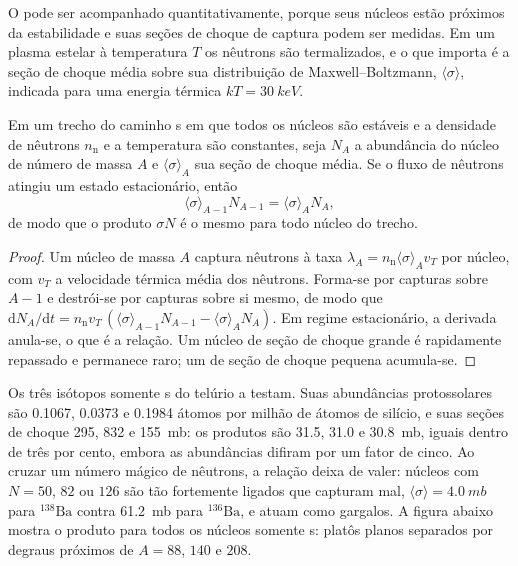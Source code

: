 O  pode ser acompanhado quantitativamente, porque seus núcleos estão
próximos da estabilidade e suas seções de choque de captura podem ser medidas. Em um
plasma estelar à temperatura $T$ os nêutrons são termalizados, e o que
importa é a seção de choque média sobre sua distribuição de Maxwell--Boltzmann,
$\langle\sigma\rangle$, indicada para uma energia térmica
$kT = \qty{30}{keV}$.

\begin{proposition}\label{prop:b3:origin-of-elements:sigma-n}
Em um trecho do caminho s em que todos os núcleos são estáveis e a densidade de nêutrons
$n_\mathrm{n}$ e a temperatura são constantes, seja $N_A$ a
abundância do núcleo de número de massa $A$ e $\langle\sigma\rangle_A$
sua seção de choque média. Se o fluxo de nêutrons atingiu um
estado estacionário, então
\[
\langle\sigma\rangle_{A-1} N_{A-1} = \langle\sigma\rangle_A N_A ,
\]
de modo que o produto $\sigma N$ é o mesmo para todo núcleo do
trecho.
\end{proposition}

\begin{proof}
Um núcleo de massa $A$ captura nêutrons à taxa
$\lambda_A = n_\mathrm{n}\langle\sigma\rangle_A v_T$ por núcleo, com
$v_T$ a velocidade térmica média dos nêutrons. Forma-se por capturas sobre
$A - 1$ e destrói-se por capturas sobre si mesmo, de modo que
$\mathrm{d}N_A/\mathrm{d}t = n_\mathrm{n} v_T\,(\langle\sigma\rangle_{A-1}
N_{A-1} - \langle\sigma\rangle_A N_A)$. Em regime estacionário, a derivada
anula-se, o que é a relação. Um núcleo de seção de choque grande é
rapidamente repassado e permanece raro; um de seção de choque pequena
acumula-se.
\end{proof}

Os três isótopos somente s do telúrio a testam. Suas abundâncias protossolares
são \num{0.1067}, \num{0.0373} e \num{0.1984} átomos por
milhão de átomos de silício, e suas seções de choque \num{295}, \num{832} e
\qty{155}{mb}: os produtos são \num{31.5}, \num{31.0} e
\qty{30.8}{mb}, iguais dentro de três por cento, embora as abundâncias
difiram por um fator de cinco. Ao cruzar um número mágico de nêutrons, a relação
deixa de valer: núcleos com $N = 50$, $82$ ou $126$ são tão fortemente ligados que
capturam mal, $\langle\sigma\rangle = \qty{4.0}{mb}$ para
$^{138}\mathrm{Ba}$ contra \qty{61.2}{mb} para $^{136}\mathrm{Ba}$, e
atuam como gargalos. A figura abaixo mostra o produto para todos os
núcleos somente s: platôs planos separados por degraus próximos de $A = 88$, $140$
e $208$.


